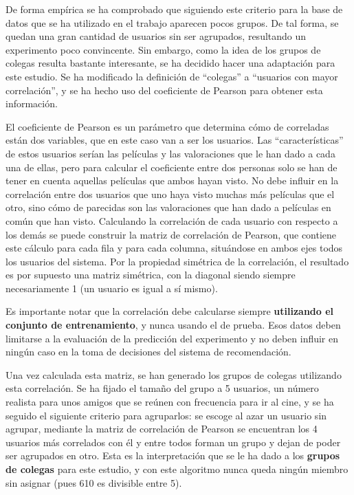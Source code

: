 De forma empírica se ha comprobado que siguiendo este criterio para la base de datos que se ha utilizado en el trabajo aparecen pocos grupos. De tal forma, se quedan una gran cantidad de usuarios sin ser agrupados, resultando un experimento poco convincente. Sin embargo, como la idea de los grupos de colegas resulta bastante interesante, se ha decidido hacer una adaptación para este estudio. Se ha modificado la definición de ``colegas'' a ``usuarios con mayor correlación'', y se ha hecho uso del coeficiente de Pearson para obtener esta información.

El coeficiente de Pearson es un parámetro que determina cómo de correladas están dos variables, que en este caso van a ser los usuarios. Las ``características'' de estos usuarios serían las películas y las valoraciones que le han dado a cada una de ellas, pero para calcular el coeficiente entre dos personas solo se han de tener en cuenta aquellas películas que ambos hayan visto. No debe influir en la correlación entre dos usuarios que uno haya visto muchas más películas que el otro, sino cómo de parecidas son las valoraciones que han dado a películas en común que han visto. Calculando la correlación de cada usuario con respecto a los demás se puede construir la matriz de correlación de Pearson, que contiene este cálculo para cada fila y para cada columna, situándose en ambos ejes todos los usuarios del sistema. Por la propiedad simétrica de la correlación, el resultado es por supuesto una matriz simétrica, con la diagonal siendo siempre necesariamente 1 (un usuario es igual a sí mismo).

Es importante notar que la correlación debe calcularse siempre \textbf{utilizando el conjunto de entrenamiento}, y nunca usando el de prueba. Esos datos deben limitarse a la evaluación de la predicción del experimento y no deben influir en ningún caso en la toma de decisiones del sistema de recomendación.

Una vez calculada esta matriz, se han generado los grupos de colegas utilizando esta correlación. Se ha fijado el tamaño del grupo a 5 usuarios, un número realista para unos amigos que se reúnen con frecuencia para ir al cine, y se ha seguido el siguiente criterio para agruparlos: se escoge al azar un usuario sin agrupar, mediante la matriz de correlación de Pearson se encuentran los 4 usuarios más correlados con él y entre todos forman un grupo y dejan de poder ser agrupados en otro. Esta es la interpretación que se le ha dado a los \textbf{grupos de colegas} para este estudio, y con este algoritmo nunca queda ningún miembro sin asignar (pues 610 es divisible entre 5).

